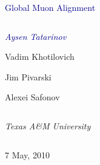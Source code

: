 \documentclass[compress]{beamer}
\begin{document}
\begin{frame}
\vfill
\begin{center}
\textcolor{darkblue}{\Large Global Muon Alignment}

\vfill
\begin{columns}
\begin{center}
\large
\textcolor{darkblue}{\it Aysen Tatarinov}

Vadim Khotilovich

Jim Pivarski

Alexei Safonov
\end{center}
\end{columns}

\begin{columns}
\begin{center}
\scriptsize
{\it Texas A\&M University}
\end{center}
\end{columns}

\vfill
 7 May, 2010

\end{center}
\end{frame}


\small
\end{document}
